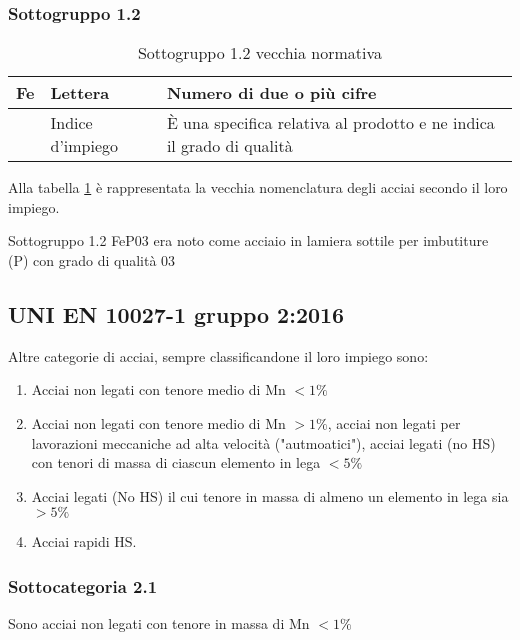 \subsubsection*{Sottogruppo 1.2}
\begin{table}
\centering
\caption{Sottogruppo 1.2 vecchia normativa}\label{tab:OldLaw1.2}
\begin{tabularx}{\textwidth}{|c|X|X|}
\toprule
\textbf{Fe} & \textbf{Lettera} & \textbf{Numero di due o più cifre}\\
\midrule
&
Indice d'impiego
&
È una specifica relativa al prodotto e ne indica il grado di qualità\\
\bottomrule
\end{tabularx}
\end{table}
Alla tabella \ref{tab:OldLaw1.2} è rappresentata la vecchia nomenclatura degli acciai secondo il loro impiego.

\begin{example}{Sottogruppo 1.2}
FeP03 era noto come acciaio in lamiera sottile per imbutiture (P) con grado di qualità 03
\end{example}

\subsection{UNI EN 10027-1 gruppo 2:2016}\label{ssc:10027-1Gruppo2}
Altre categorie di acciai, sempre classificandone il loro impiego sono:
\begin{enumerate}
\item Acciai non legati con tenore medio di Mn $<1\%$
\item Acciai non legati con tenore medio di Mn $>1\%$, acciai non legati per lavorazioni meccaniche ad alta velocità ("autmoatici"), acciai legati (no HS) con tenori di massa di ciascun elemento in lega $<5\%$
\item Acciai legati (No HS) il cui tenore in massa di almeno un elemento in lega sia $>5\%$
\item Acciai rapidi HS.
\end{enumerate}

\subsubsection{Sottocategoria 2.1}\label{sssc:Sottogruppo2.1}
Sono acciai non legati con tenore in massa di Mn $<1\%$

